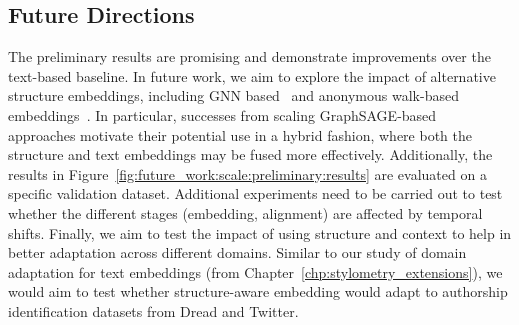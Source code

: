 \subsection{Future Directions}
The preliminary results are promising and demonstrate improvements over the text-based baseline.
In future work, we aim to explore the impact of alternative structure embeddings, including GNN based~\cite{velivckovic2018graph,hamilton2017inductive} and anonymous walk-based embeddings~\citep{ivanov2018anonymous,wang2020inductive}.
In particular, successes from scaling GraphSAGE-based~\cite{hamilton2017inductive,ying2018graph} approaches motivate their potential use in a hybrid fashion, where both the structure and text embeddings may be fused more effectively.
Additionally, the results in Figure~\ref{fig:future_work:scale:preliminary:results} are evaluated on a specific validation dataset.
Additional experiments need to be carried out to test whether the different stages (embedding, alignment) are affected by temporal shifts.
Finally, we aim to test the impact of using structure and context to help in better adaptation across different domains.
Similar to our study of domain adaptation for text embeddings (from Chapter~\ref{chp:stylometry_extensions}), we would aim to test whether structure-aware embedding would adapt to authorship identification datasets from Dread and Twitter.

